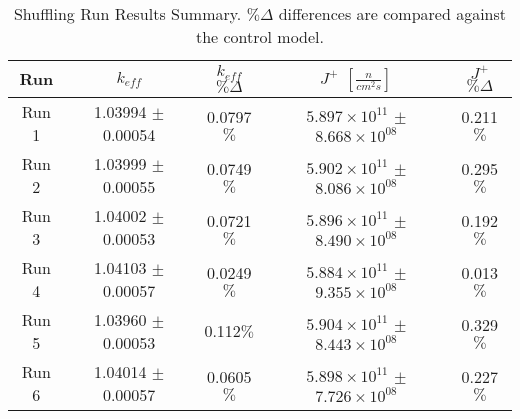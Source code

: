 

\begin{table}[H]
\centering
\caption[Shuffling Run Results Summary]{Shuffling Run Results Summary.  $\%\Delta$ differences are compared against the control model.}
 \begin{tabularx}{0.7\textwidth}{c  c  c  c  c}
 	\hline
 	Run & $k_{eff}$ & $k_{eff}$ $\% \Delta$ & $J^+$  $[\frac{n}{cm^2s}]$ & $J^+$ $\% \Delta$ \\
 	\hline
 	Run 1 & 1.03994 $\pm$ 0.00054 & 0.0797$\%$ & $5.897\times10^{11}$ $\pm$ $8.668\times10^{08}$ & 0.211$\%$ \\
 	Run 2 & 1.03999 $\pm$ 0.00055 & 0.0749$\%$ & $5.902\times10^{11}$ $\pm$ $8.086\times10^{08}$  & 0.295$\%$ \\
 	Run 3 & 1.04002 $\pm$ 0.00053 & 0.0721$\%$ & $5.896\times10^{11}$ $\pm$ $8.490\times10^{08}$ & 0.192$\%$  \\
 	Run 4 & 1.04103 $\pm$ 0.00057 & 0.0249$\%$ & $5.884\times10^{11}$ $\pm$ $9.355\times10^{08}$ & 0.013$\%$ \\
 	Run 5 & 1.03960 $\pm$ 0.00053 & 0.112$\%$ & $5.904\times10^{11}$ $\pm$ $8.443\times10^{08}$ & 0.329$\%$  \\
 	Run 6 & 1.04014 $\pm$ 0.00057 & 0.0605$\%$ & $5.898\times10^{11}$ $\pm$ $7.726\times10^{08}$ & 0.227$\%$ \\
 	\hline

 \end{tabularx}
\label{table:shufsens}
\end{table}